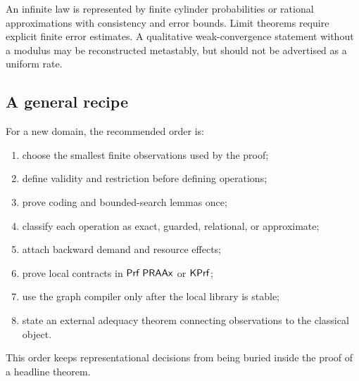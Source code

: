An infinite law is represented by finite cylinder probabilities or rational
approximations with consistency and error bounds.  Limit theorems require
explicit finite error estimates.  A qualitative weak-convergence statement
without a modulus may be reconstructed metastably, but should not be advertised
as a uniform rate.

\subsection{A general recipe}

For a new domain, the recommended order is:

\begin{enumerate}
\item choose the smallest finite observations used by the proof;
\item define validity and restriction before defining operations;
\item prove coding and bounded-search lemmas once;
\item classify each operation as exact, guarded, relational, or approximate;
\item attach backward demand and resource effects;
\item prove local contracts in \(\mathsf{Prf}\;\mathsf{PRAAx}\) or \(\mathsf{KPrf}\);
\item use the graph compiler only after the local library is stable;
\item state an external adequacy theorem connecting observations to the
classical object.
\end{enumerate}

This order keeps representational decisions from being buried inside the proof
of a headline theorem.
